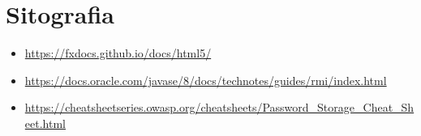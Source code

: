 \section{Sitografia}
\begin{itemize}
  \item \url{https://fxdocs.github.io/docs/html5/}
  \item \url{https://docs.oracle.com/javase/8/docs/technotes/guides/rmi/index.html}
  \item \url{https://cheatsheetseries.owasp.org/cheatsheets/Password_Storage_Cheat_Sheet.html}
\end{itemize}
